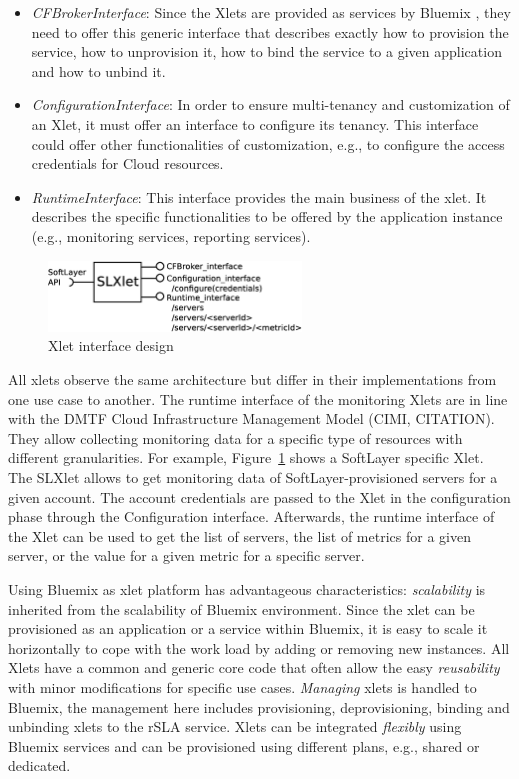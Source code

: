 \begin{itemize}
 \item \emph{CFBrokerInterface}: Since the Xlets are provided as services by Bluemix , they need to offer this generic interface that describes exactly how to provision the 
service, how to unprovision it, how to bind the service to a given application and how to unbind it. 
\item  \emph{ConfigurationInterface}: In order to ensure multi-tenancy and customization of an Xlet, it must offer an interface to configure its tenancy. This interface could offer other functionalities of customization, e.g., to configure the access credentials for Cloud resources.
\item  \emph{RuntimeInterface}: This interface provides the main business of the xlet. It describes the specific functionalities to be offered by the application instance (e.g., monitoring services, reporting services). 
\end{itemize}
\begin{figure}[H]
\centering
\includegraphics[width=0.6\textwidth]{pics/SLXlet}
\caption{\label{fig:xlet} Xlet interface design}
\end{figure}

All xlets observe the same architecture but differ in their implementations from one use case to another. The runtime interface of the monitoring Xlets are in line with the DMTF Cloud Infrastructure Management Model (CIMI, CITATION). They allow collecting monitoring data for a specific type of resources with different granularities. For example, 
Figure~\ref{fig:xlet} shows a SoftLayer specific Xlet. The SLXlet allows to get monitoring data of SoftLayer-provisioned servers for a given account. The account credentials are 
passed to the Xlet in the configuration phase through the Configuration interface. Afterwards, the runtime interface of the Xlet can be used to get the list of servers, the list 
of metrics for a given server, or the value for a given metric for a specific server.


Using Bluemix as xlet platform has  advantageous characteristics: {\em scalability} is inherited from the scalability of Bluemix environment. Since the xlet can be provisioned as an application or a service within 
Bluemix, it is easy to scale it horizontally to cope with the work load by adding or removing new instances.
All Xlets have a common and generic core code that often allow the easy {\em reusability} with minor modifications for specific use cases.
{\em Managing} xlets is handled to Bluemix, the management here includes provisioning, deprovisioning, binding and unbinding xlets to the rSLA service.
Xlets can be integrated {\em flexibly} using Bluemix services and can be provisioned using different plans, e.g., shared or dedicated. 


